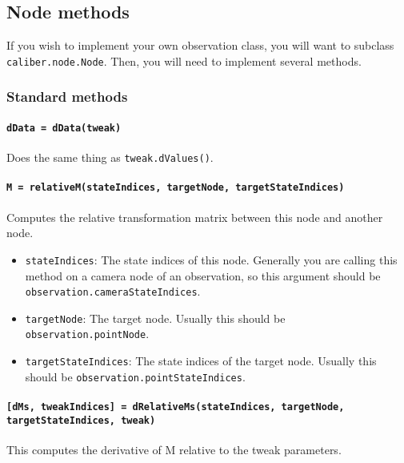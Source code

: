 \subsection{Node methods}

If you wish to implement your own observation class, you will want to subclass \\
\texttt{caliber.node.Node}.
Then, you will need to implement several methods.

\subsubsection{Standard methods}

\paragraph{\texttt{dData = dData(tweak)}}

Does the same thing as \texttt{tweak.dValues()}.

\paragraph{\texttt{M = relativeM(stateIndices, targetNode, targetStateIndices)}}

Computes the relative transformation matrix between this node and another node.

\begin{itemize}
    \item \texttt{stateIndices}: The state indices of this node. 
        Generally you are calling this method on a camera node of an observation, so this argument should be \texttt{observation.cameraStateIndices}.
    \item \texttt{targetNode}: The target node. Usually this should be \texttt{observation.pointNode}.
    \item \texttt{targetStateIndices}: The state indices of the target node. Usually this should be \texttt{observation.pointStateIndices}.
\end{itemize}

\paragraph{\texttt{[dMs, tweakIndices] = dRelativeMs(stateIndices, targetNode, targetStateIndices, tweak)}}

This computes the derivative of M relative to the tweak parameters.

